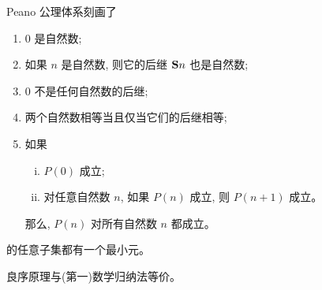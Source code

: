 \begin{frame}{}
  \begin{center}
    Peano 公理体系刻画了
  \end{center}

  \begin{definition}
    \begin{enumerate}[(1)]
      \setlength{\itemsep}{6pt}
      \item 0 是自然数;
      \item 如果 $n$ 是自然数, 则它的后继 ${\bf S}n$ 也是自然数;
      \item 0 不是任何自然数的后继;
      \item 两个自然数相等当且仅当它们的后继相等;
      \item {} 如果
        \begin{enumerate}[(i)]
          \setlength{\itemsep}{8pt}
          \item $P(0)$ 成立;
          \item 对任意自然数 $n$, 如果 $P(n)$ 成立, 则 $P(n+1)$ 成立。
        \end{enumerate}
        那么, $P(n)$ 对所有自然数 $n$ 都成立。
    \end{enumerate}
  \end{definition}
\end{frame}

\begin{frame}{}
  \begin{definition}
    的任意子集都有一个最小元。
  \end{definition}

  \pause
  \vspace{0.60cm}
  \begin{theorem}{}
    良序原理与(第一)数学归纳法等价。
  \end{theorem}
\end{frame}

